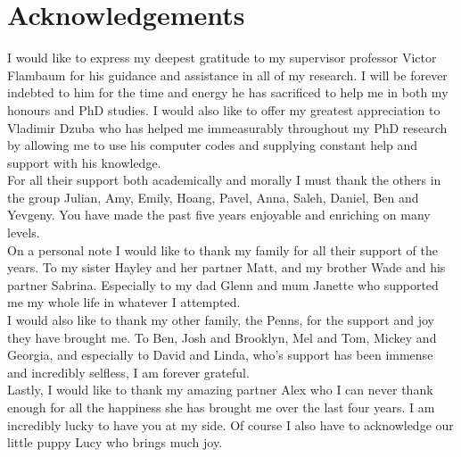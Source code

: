 \documentclass[10pt,a4paper, twoside, openright]{report}
\begin{document}
\chapter*{Acknowledgements}
\thispagestyle{empty}
I would like to express my deepest gratitude to my supervisor professor Victor Flambaum for his guidance and assistance in all of my research. I will be forever indebted to him for the time and energy he has sacrificed to help me in both my honours and PhD studies. I would also like to offer my greatest appreciation to  Vladimir Dzuba who has helped me immeasurably throughout my PhD research by allowing me to use his computer codes and supplying constant help and support with his knowledge. \\
\linebreak
For all their support both academically and morally I must thank the others in the group Julian, Amy, Emily, Hoang, Pavel, Anna, Saleh, Daniel, Ben and Yevgeny. You have made the past five years enjoyable and enriching on many levels.  \\
\linebreak
On a personal note I would like to thank my family for all their support of the years. To my sister Hayley and her partner Matt, and my brother Wade and his partner Sabrina. Especially to my dad Glenn and mum Janette who supported me my whole life in whatever I attempted. \\
\linebreak
I would also like to thank my other family, the Penns, for the support and joy they have brought me. To Ben, Josh and Brooklyn, Mel and Tom, Mickey and Georgia, and especially to David and Linda, who's support has been immense and incredibly selfless, I am forever grateful.\\
\linebreak
Lastly, I would like to thank my amazing partner Alex who I can never thank enough for all the happiness she has brought me over the last four years. I am incredibly lucky to have you at my side. Of course I also have to acknowledge our little puppy Lucy who brings much joy.
\clearpage
\end{document}
